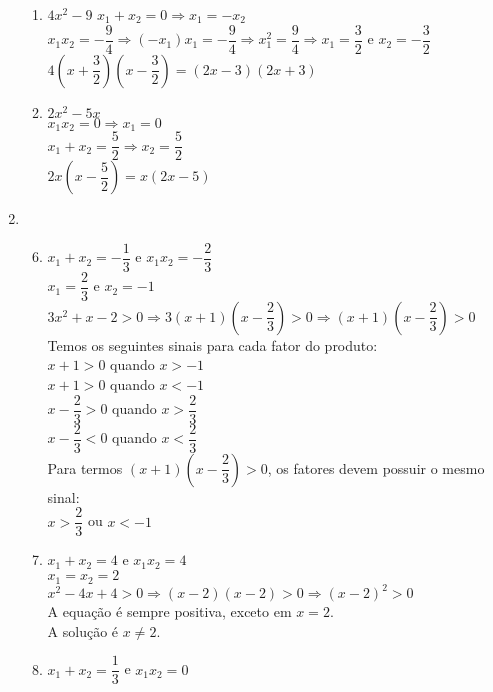 \begin{enumerate}
\begin{enumerate}
				
				\item %
				$4x^2 - 9$
				$x_{1} + x_{2} = 0 \Rightarrow x_{1} = -x_{2}$\\
				$x_{1}x_{2} = -\dfrac{9}{4} \Rightarrow (-x_{1})x_{1} = -\dfrac{9}{4} \Rightarrow x_{1}^2 = \dfrac{9}{4} \Rightarrow x_{1} = \dfrac{3}{2}$ e $x_{2} = -\dfrac{3}{2}$\\
				$4(x+\dfrac{3}{2})(x-\dfrac{3}{2}) = \boxed{(2x-3)(2x+3)}$
				\item %
				$2x^2 - 5x$\\
			 	$x_{1}x_{2} = 0 \Rightarrow x_{1} = 0$\\
			 	$x_{1} + x_{2} = \dfrac{5}{2} \Rightarrow x_{2}  = \dfrac{5}{2}$\\
			 	$2x(x-\dfrac{5}{2}) = \boxed{x(2x-5)}$
		\end{enumerate}
	\item %
		\begin{enumerate}
			\setcounter{enumii}{5}
			\item %
			$x_{1}+x_{2}= -\dfrac{1}{3}$ e $x_{1}x_{2}=-\dfrac{2}{3} $\\[6pt]
			$x_{1}=\dfrac{2}{3}$ e $x_{2}=-1$\\[6pt]
			$3x^2+x-2 > 0 \Rightarrow 3(x+1)(x-\dfrac{2}{3}) > 0 \Rightarrow (x+1)(x-\dfrac{2}{3}) > 0$\\[6pt]
			Temos os seguintes sinais para cada fator do produto:\\
			$x + 1 > 0$ quando $x > -1$\\
			$x + 1 > 0$ quando $x < -1$\\
			$x-\dfrac{2}{3} > 0$ quando $x > \dfrac{2}{3}$\\[6pt]
			$x-\dfrac{2}{3} < 0$ quando $x < \dfrac{2}{3}$\\[6pt]
			Para termos $(x+1)(x-\dfrac{2}{3}) > 0$, os fatores devem possuir o mesmo sinal:\\
			$x > \dfrac{2}{3}$ ou  $x < -1$
			\item %
			$x_{1}+x_{2}= 4$ e $x_{1}x_{2}= 4$\\
			$x_{1} = x_{2}= 2$\\
			$x^2-4x+4 > 0 \Rightarrow (x - 2)(x - 2) > 0 \Rightarrow (x-2)^2 >0$\\
			A equação é sempre positiva, exceto em $x = 2$.\\
			A solução é $x \neq 2$.
			\item %
			$x_{1}+x_{2}=\dfrac{1}{3}$ e $x_{1}x_{2}= 0$\\[6pt]

\end{enumerate}
\end{enumerate}
